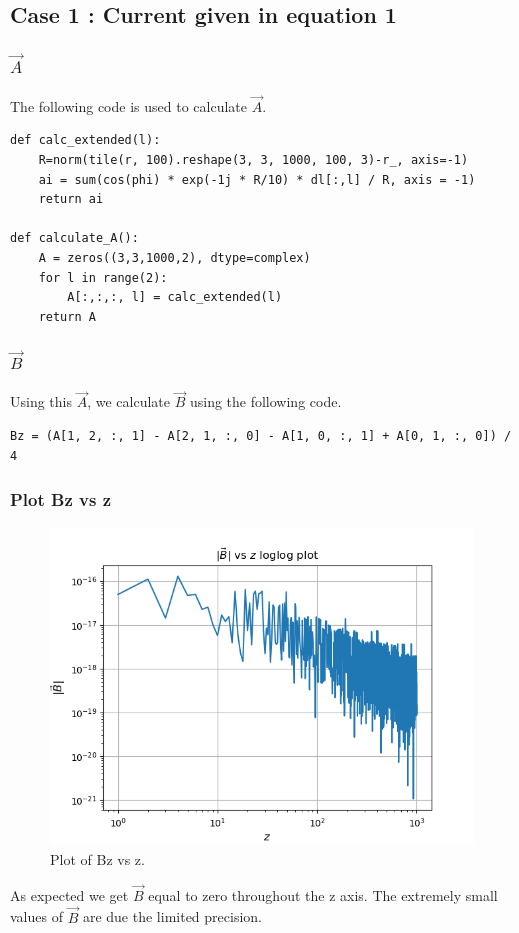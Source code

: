 \documentclass[11pt, a4paper]{article}
\begin{document}
\subsection{Case 1 : Current given in equation 1}
\subsubsection{$\vec{A}$}
The following code is used to calculate $\vec{A}$.\\
\begin{lstlisting}
def calc_extended(l):
	R=norm(tile(r, 100).reshape(3, 3, 1000, 100, 3)-r_, axis=-1)   
	ai = sum(cos(phi) * exp(-1j * R/10) * dl[:,l] / R, axis = -1)
	return ai

def calculate_A():
	A = zeros((3,3,1000,2), dtype=complex) 
	for l in range(2):
		A[:,:,:, l] = calc_extended(l)
	return A

\end{lstlisting}
\subsubsection{$\vec{B}$}
Using this $\vec{A}$, we calculate  $\vec{B}$ using the following code.
\begin{lstlisting}
Bz = (A[1, 2, :, 1] - A[2, 1, :, 0] - A[1, 0, :, 1] + A[0, 1, :, 0]) / 4
\end{lstlisting}

\subsubsection{Plot Bz vs z}
\begin{figure}[!tbh]
   	\centering
   	\includegraphics[scale=0.5]{fig2.png}  %
   	\caption{Plot of Bz vs z.}
   	\label{fig:sample}
   \end{figure}
As expected we get $\vec{B}$ equal to zero throughout the z axis. The extremely small values of $\vec{B}$ are due the limited precision.
\end{document}
